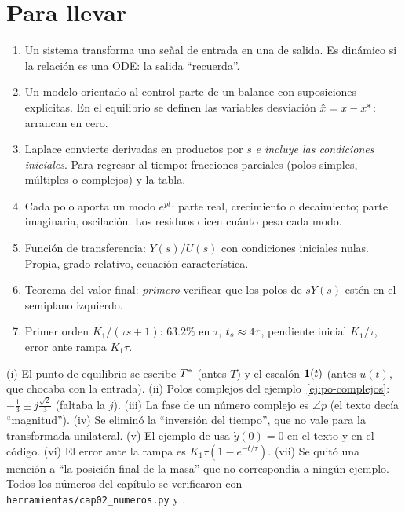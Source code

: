 \section{Para llevar}
\label{sec:po-cierre}

\begin{parallevar}
\begin{enumerate}
  \item Un sistema transforma una señal de entrada en una de salida. Es dinámico si la relación es una ODE: la salida ``recuerda''.
  \item Un modelo orientado al control parte de un balance con suposiciones explícitas. En el equilibrio se definen las variables desviación $\hat{x}=x-x^{*}$: arrancan en cero.
  \item Laplace convierte derivadas en productos por $s$ \emph{e incluye las condiciones iniciales}. Para regresar al tiempo: fracciones parciales (polos simples, múltiples o complejos) y la tabla.
  \item Cada polo aporta un modo $e^{pt}$: parte real, crecimiento o decaimiento; parte imaginaria, oscilación. Los residuos dicen cuánto pesa cada modo.
  \item Función de transferencia: $Y(s)/U(s)$ con condiciones iniciales nulas. Propia, grado relativo, ecuación característica.
  \item Teorema del valor final: \emph{primero} verificar que los polos de $sY(s)$ estén en el semiplano izquierdo.
  \item Primer orden $K_1/(\tau s+1)$: $63.2\%$ en $\tau$, $t_s\approx4\tau$, pendiente inicial $K_1/\tau$, error ante rampa $K_1\tau$.
\end{enumerate}
\end{parallevar}

\begin{profundiza}
(i) El punto de equilibrio se escribe $T^{*}$ (antes $\bar T$) y el escalón $\mathbf{1}(t)$ (antes $u(t)$, que chocaba con la entrada). (ii) Polos complejos del ejemplo~\ref{ej:po-complejos}: $-\tfrac13\pm j\tfrac{\sqrt2}{3}$ (faltaba la $j$). (iii) La fase de un número complejo es $\angle p$ (el texto decía ``magnitud''). (iv) Se eliminó la ``inversión del tiempo'', que no vale para la transformada unilateral. (v) El ejemplo de  usa $\dot y(0)=0$ en el texto y en el código. (vi) El error ante la rampa es $K_1\tau(1-e^{-t/\tau})$. (vii) Se quitó una mención a ``la posición final de la masa'' que no correspondía a ningún ejemplo. Todos los números del capítulo se verificaron con \texttt{herramientas/cap02\_numeros.py} y .
\end{profundiza}


